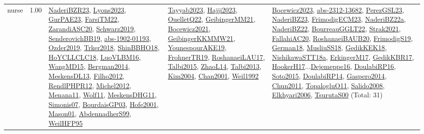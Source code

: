 {\begin{longtable}{p{3cm}r>{\raggedright\arraybackslash}p{6cm}>{\raggedright\arraybackslash}p{6cm}>{\raggedright\arraybackslash}p{8cm}}
\index{nurse}\index{ApplicationAreas!nurse}nurse &  1.00 & \hyperref[detail:NaderiBZR23]{NaderiBZR23}, \hyperref[detail:Lyons2023]{Lyons2023}, \hyperref[detail:GurPAE23]{GurPAE23}, \hyperref[detail:FarsiTM22]{FarsiTM22}, \hyperref[detail:ZarandiASC20]{ZarandiASC20}, \hyperref[detail:Schwarz2019]{Schwarz2019}, \hyperref[detail:SenderovichBB19]{SenderovichBB19}, \hyperref[detail:abs-1902-01193]{abs-1902-01193}, \hyperref[detail:Ozder2019]{Ozder2019}, \hyperref[detail:Trker2018]{Trker2018}, \hyperref[detail:ShinBBHO18]{ShinBBHO18}, \hyperref[detail:HoYCLLCLC18]{HoYCLLCLC18}, \hyperref[detail:LuoVLBM16]{LuoVLBM16}, \hyperref[detail:WangMD15]{WangMD15}, \hyperref[detail:Bergman2014]{Bergman2014}, \hyperref[detail:MeskensDL13]{MeskensDL13}, \hyperref[detail:Filho2012]{Filho2012}, \hyperref[detail:RendlPHPR12]{RendlPHPR12}, \hyperref[detail:Michel2012]{Michel2012}, \hyperref[detail:Menana11]{Menana11}, \hyperref[detail:Wolf11]{Wolf11}, \hyperref[detail:MeskensDHG11]{MeskensDHG11}, \hyperref[detail:Simonis07]{Simonis07}, \hyperref[detail:BourdaisGP03]{BourdaisGP03}, \hyperref[detail:Hofe2001]{Hofe2001}, \hyperref[detail:Mason01]{Mason01}, \hyperref[detail:AbdennadherS99]{AbdennadherS99}, \hyperref[detail:WeilHFP95]{WeilHFP95} & \hyperref[detail:Tayyab2023]{Tayyab2023}, \hyperref[detail:Hajji2023]{Hajji2023}, \hyperref[detail:OuelletQ22]{OuelletQ22}, \hyperref[detail:GeibingerMM21]{GeibingerMM21}, \hyperref[detail:Bocewicz2021]{Bocewicz2021}, \hyperref[detail:GeibingerKKMMW21]{GeibingerKKMMW21}, \hyperref[detail:YounespourAKE19]{YounespourAKE19}, \hyperref[detail:FrohnerTR19]{FrohnerTR19}, \hyperref[detail:RoshanaeiLAU17]{RoshanaeiLAU17}, \hyperref[detail:Talbi2015]{Talbi2015}, \hyperref[detail:ZhaoL14]{ZhaoL14}, \hyperref[detail:Talbi2013]{Talbi2013}, \hyperref[detail:Kim2004]{Kim2004}, \hyperref[detail:Chan2001]{Chan2001}, \hyperref[detail:Weil1992]{Weil1992} & \hyperref[detail:Bocewicz2023]{Bocewicz2023}, \hyperref[detail:abs-2312-13682]{abs-2312-13682}, \hyperref[detail:PerezGSL23]{PerezGSL23}, \hyperref[detail:NaderiBZ23]{NaderiBZ23}, \hyperref[detail:FrimodigECM23]{FrimodigECM23}, \hyperref[detail:NaderiBZ22a]{NaderiBZ22a}, \hyperref[detail:NaderiBZ22]{NaderiBZ22}, \hyperref[detail:BourreauGGLT22]{BourreauGGLT22}, \hyperref[detail:Strak2021]{Strak2021}, \hyperref[detail:FallahiAC20]{FallahiAC20}, \hyperref[detail:RoshanaeiBAUB20]{RoshanaeiBAUB20}, \hyperref[detail:FrimodigS19]{FrimodigS19}, \hyperref[detail:German18]{German18}, \hyperref[detail:MusliuSS18]{MusliuSS18}, \hyperref[detail:GedikKEK18]{GedikKEK18}, \hyperref[detail:NishikawaSTT18a]{NishikawaSTT18a}, \hyperref[detail:ErkingerM17]{ErkingerM17}, \hyperref[detail:GedikKBR17]{GedikKBR17}, \hyperref[detail:HookerH17]{HookerH17}...\hyperref[detail:Dejemeppe16]{Dejemeppe16}, \hyperref[detail:DoulabiRP16]{DoulabiRP16}, \hyperref[detail:Soto2015]{Soto2015}, \hyperref[detail:DoulabiRP14]{DoulabiRP14}, \hyperref[detail:Gaspero2014]{Gaspero2014}, \hyperref[detail:Chun2011]{Chun2011}, \hyperref[detail:TopalogluO11]{TopalogluO11}, \hyperref[detail:Salido2008]{Salido2008}, \hyperref[detail:Elkhyari2006]{Elkhyari2006}, \hyperref[detail:TsurutaS00]{TsurutaS00} (Total: 31)\\

\end{longtable}}
